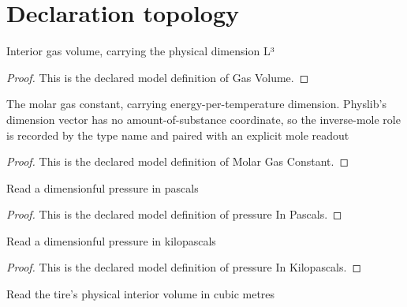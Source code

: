 \section{Declaration topology}
\begin{definition}
  \label{def:physics:phyx-mini-0441:phyxminiproblems-problemphyxmini0441-gasvolume}
  Interior gas volume, carrying the physical dimension L³
\end{definition}
\begin{proof}
  This is the declared model definition of Gas Volume.
\end{proof}
\begin{definition}
  \label{def:physics:phyx-mini-0441:phyxminiproblems-problemphyxmini0441-molargasconstant}
  The molar gas constant, carrying energy-per-temperature dimension. Physlib's dimension vector has no amount-of-substance coordinate, so the inverse-mole role is recorded by the type name and paired with an explicit mole readout
\end{definition}
\begin{proof}
  This is the declared model definition of Molar Gas Constant.
\end{proof}
\begin{definition}
  \label{def:physics:phyx-mini-0441:phyxminiproblems-problemphyxmini0441-pressureinpascals}
  Read a dimensionful pressure in pascals
\end{definition}
\begin{proof}
  This is the declared model definition of pressure In Pascals.
\end{proof}
\begin{definition}
  \label{def:physics:phyx-mini-0441:phyxminiproblems-problemphyxmini0441-pressureinkilopascals}
  Read a dimensionful pressure in kilopascals
\end{definition}
\begin{proof}
  This is the declared model definition of pressure In Kilopascals.
\end{proof}
\begin{definition}
  \label{def:physics:phyx-mini-0441:phyxminiproblems-problemphyxmini0441-volumeincubicmeters}
  Read the tire's physical interior volume in cubic metres
\end{definition}

